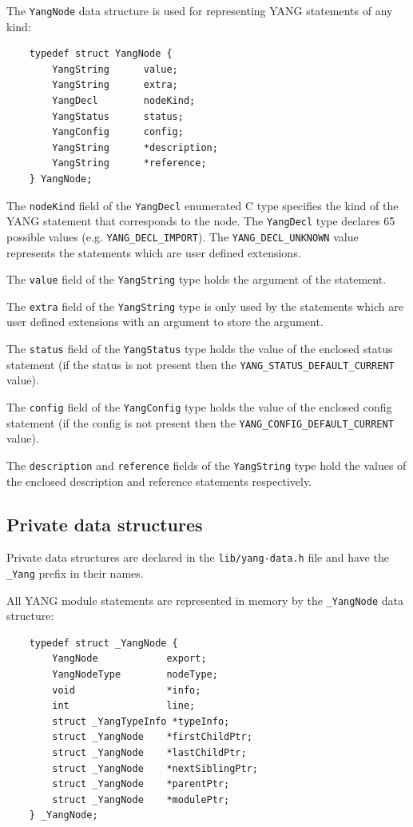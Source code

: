 \documentclass[conference]{IEEEtran}
\begin{document}
The \texttt{YangNode} data structure is used for representing YANG statements of any kind:
\small
\begin{center}
\begin{verbatim}
    typedef struct YangNode {
        YangString      value;
        YangString      extra;
        YangDecl        nodeKind;
        YangStatus      status;
        YangConfig      config;
        YangString      *description;
        YangString      *reference;
    } YangNode;
\end{verbatim}
\end{center}
\normalsize
The \texttt{nodeKind} field of the \texttt{YangDecl} enumerated C type specifies the kind of the YANG statement that corresponds to the node. The \texttt{YangDecl} type declares 65 possible values (e.g. \texttt{YANG\_DECL\_IMPORT}). The \texttt{YANG\_DECL\_UNKNOWN} value represents the statements which are user defined extensions.

The \texttt{value} field of the \texttt{YangString} type holds the argument of the statement.

The \texttt{extra} field of the \texttt{YangString} type is only used by the statements which are user defined extensions with an argument to store the argument.

The \texttt{status} field of the \texttt{YangStatus} type holds the value of the enclosed status statement (if the status is not present then the \texttt{YANG\_STATUS\_DEFAULT\_CURRENT} value).

The \texttt{config} field of the \texttt{YangConfig} type holds the value of the enclosed config statement (if the config is not present then the \texttt{YANG\_CONFIG\_DEFAULT\_CURRENT} value).

The \texttt{description} and \texttt{reference} fields of the \texttt{YangString} type hold the values of the enclosed description and reference statements respectively.

\subsection{Private data structures}
Private data structures are declared in the \texttt{lib/yang-data.h} file and have the \texttt{\_Yang} prefix in their names. 

All YANG module statements are represented in memory by the \texttt{\_YangNode} data structure:
\small
\begin{verbatim}
    typedef struct _YangNode {
        YangNode            export;
        YangNodeType        nodeType;
        void                *info;
        int                 line;
        struct _YangTypeInfo *typeInfo;
        struct _YangNode  	*firstChildPtr;
        struct _YangNode  	*lastChildPtr;    
        struct _YangNode  	*nextSiblingPtr;
        struct _YangNode  	*parentPtr;
        struct _YangNode  	*modulePtr;
    } _YangNode;
\end{verbatim}
\normalsize
\end{document}
